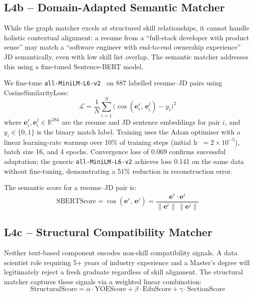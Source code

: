 \documentclass[conference]{IEEEtran}
\begin{document}
\subsection{L4b -- Domain-Adapted Semantic Matcher}
While the graph matcher excels at structured skill relationships, it cannot
handle holistic contextual alignment: a resume from a ``full-stack developer
with product sense'' may match a ``software engineer with end-to-end ownership
experience'' JD semantically, even with low skill list overlap. The semantic
matcher addresses this using a fine-tuned Sentence-BERT model.

We fine-tune \texttt{all-MiniLM-L6-v2}~\cite{reimers2019sbert} on 887
labelled resume--JD pairs using CosineSimilarityLoss:
\begin{equation}
  \mathcal{L} = \frac{1}{N}\sum_{i=1}^{N}
    \bigl(\cos(\mathbf{e}^r_i,\, \mathbf{e}^j_i) - y_i\bigr)^2
  \label{eq:loss}
\end{equation}
where $\mathbf{e}^r_i, \mathbf{e}^j_i \in \mathbb{R}^{384}$ are the resume
and JD sentence embeddings for pair $i$, and $y_i \in \{0,1\}$ is the binary
match label. Training uses the Adam optimiser with a linear learning-rate
warmup over 10\% of training steps (initial lr~$= 2 \times 10^{-5}$),
batch size 16, and 4 epochs. Convergence loss of 0.069 confirms successful
adaptation; the generic \texttt{all-MiniLM-L6-v2} achieves loss 0.141 on
the same data without fine-tuning, demonstrating a 51\% reduction in
reconstruction error.

The semantic score for a resume--JD pair is:
\begin{equation}
  \text{SBERTScore} = \cos(\mathbf{e}^r,\, \mathbf{e}^j)
    = \frac{\mathbf{e}^r \cdot \mathbf{e}^j}
           {\|\mathbf{e}^r\|\, \|\mathbf{e}^j\|}
  \label{eq:sbert}
\end{equation}

\subsection{L4c -- Structural Compatibility Matcher}
Neither text-based component encodes non-skill compatibility signals.
A data scientist role requiring 5+ years of industry experience and
a Master's degree will legitimately reject a fresh graduate regardless
of skill alignment. The structural matcher captures these signals via a
weighted linear combination:
\begin{equation}
  \text{StructuralScore} = \alpha \cdot \text{YOEScore}
                         + \beta  \cdot \text{EduScore}
                         + \gamma \cdot \text{SectionScore}
  \label{eq:struct}
\end{equation}
\end{document}
